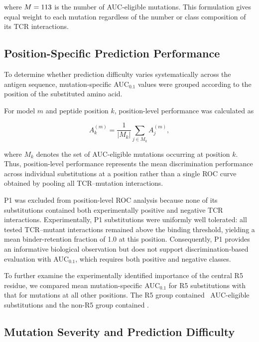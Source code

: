 \documentclass{article}
\begin{document}
where $M=113$ is the number of AUC-eligible mutations. This formulation gives
equal weight to each mutation regardless of the number or class composition
of its TCR interactions.


\subsection{Position-Specific Prediction Performance}

To determine whether prediction difficulty varies systematically across the
antigen sequence, mutation-specific AUC$_{0.1}$ values were grouped according
to the position of the substituted amino acid.

For model $m$ and peptide position $k$, position-level performance was
calculated as

\begin{equation}
A_k^{(m)}
=
\frac{1}{|M_k|}
\sum_{j \in M_k}
A_j^{(m)},
\label{eq:position_auc}
\end{equation}

where $M_k$ denotes the set of AUC-eligible mutations occurring at position
$k$. Thus, position-level performance represents the mean discrimination
performance across individual substitutions at a position rather than a
single ROC curve obtained by pooling all TCR--mutation interactions.

P1 was excluded from position-level ROC analysis because none of its
substitutions contained both experimentally positive and negative TCR
interactions. Experimentally, P1 substitutions were uniformly well tolerated:
all tested TCR--mutant interactions remained above the binding threshold,
yielding a mean binder-retention fraction of 1.0 at this position.
Consequently, P1 provides an informative biological observation but does not
support discrimination-based evaluation with AUC$_{0.1}$, which requires
both positive and negative classes.

To further examine the experimentally identified importance of the central
R5 residue, we compared mean mutation-specific AUC$_{0.1}$ for R5
substitutions with that for mutations at all other positions. The R5 group
contained \valNrfive\ AUC-eligible substitutions and the non-R5 group contained \valNnonrfive.


\subsection{Mutation Severity and Prediction Difficulty}
\end{document}
